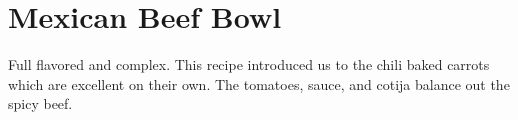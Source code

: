 \section[Beef Bowl]{Mexican Beef Bowl}\label{mexican_beef_bowl}

\begin{recipestats}[
        servings=4 people,
        preptime=30 \minute,
        bakingtime=30 \minute,
        source=Mike \& Jane,
        original=\citeauthor{blueApronBeefBowl}~\cite{blueApronBeefBowl}
    ]
\end{recipestats}

\begin{recipeabstract}
    Full flavored and complex.
    This recipe introduced us to the chili baked carrots which are excellent on their own.
    The tomatoes, sauce, and cotija balance out the spicy beef.
\end{recipeabstract}

\begin{ingredientcolumns}
    \begin{ingredientblock}
        \\
        \\
        \\
        \\
        \\
        \\
        \\
        \\
    \end{ingredientblock}
    \begin{ingredientblock}
        \\
        \\
        \\
        \\
        \\
        \\
    \end{ingredientblock}
\end{ingredientcolumns}

